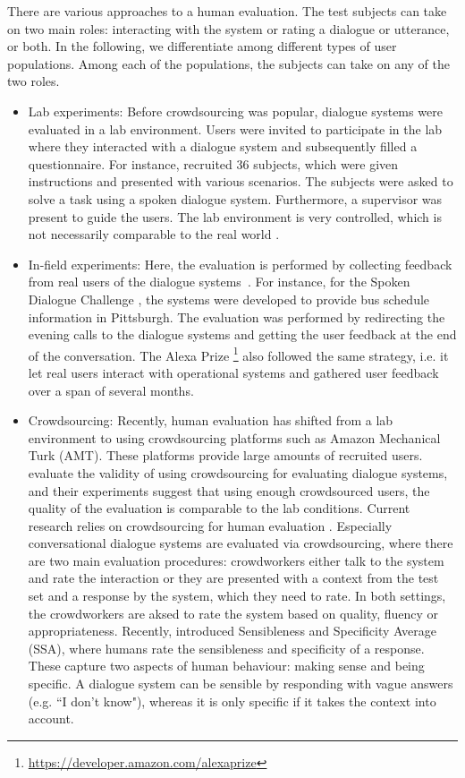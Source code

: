 There are various approaches to a human evaluation. The test subjects can take on two main roles: interacting with the system or rating a dialogue or utterance, or both. In the following, we differentiate among different types of user populations. Among each of the populations, the subjects can take on any of the two roles. 
\begin{itemize}
\item Lab experiments: Before crowdsourcing was popular, dialogue systems were evaluated in a lab environment. Users were invited to participate in the lab where they interacted with a dialogue system and subsequently filled a questionnaire. For instance,  recruited 36 subjects, which were given instructions and presented with various scenarios. The subjects were asked to solve a task using a spoken dialogue system. Furthermore, a supervisor was present to guide the users. The lab environment is very controlled, which is not necessarily comparable to the real world .
\item In-field experiments: Here, the evaluation is performed by collecting feedback from real users of the dialogue systems~. For instance, for the Spoken Dialogue Challenge , the systems were developed to provide bus schedule information in Pittsburgh. The evaluation was performed by redirecting the evening calls to the dialogue systems and getting the user feedback at the end of the conversation. The Alexa Prize \footnote{\url{https://developer.amazon.com/alexaprize}} also followed the same strategy, i.e. it let real users interact with operational systems and gathered user feedback over a span of several months.
\item Crowdsourcing: Recently, human evaluation has shifted from a lab environment to using crowdsourcing platforms such as Amazon Mechanical Turk (AMT). These platforms provide large amounts of recruited users.  evaluate the validity of using crowdsourcing for evaluating dialogue systems, and their experiments suggest that using enough crowdsourced users, the quality of the evaluation is comparable to the lab conditions. Current research relies on crowdsourcing for human evaluation . 
Especially conversational dialogue systems are evaluated via crowdsourcing, where there are two main evaluation procedures: crowdworkers either talk to the system and rate the interaction or they are presented with a context from the test set and a response by the system, which they need to rate. In both settings, the crowdworkers are aksed to rate the system based on quality, fluency or appropriateness. Recently,  introduced Sensibleness and Specificity Average (SSA), where humans rate the sensibleness and specificity of a response. These capture two aspects of human behaviour: making sense and being specific. A dialogue system can be sensible by responding with vague answers (e.g. ``I don't know"), whereas it is only specific if it takes the context into account.
\end{itemize}
